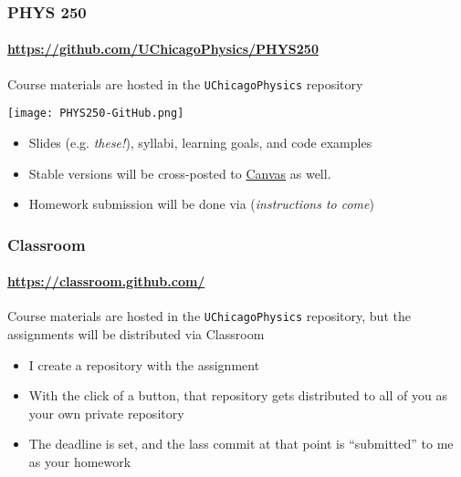 \documentclass[hyperref={colorlinks=true}]{beamer}
\begin{document}
\begin{frame}%
  \frametitle{PHYS 250 \github}
  \framesubtitle{\url{https://github.com/UChicagoPhysics/PHYS250}}
  
  Course materials are hosted in the \github \texttt{UChicagoPhysics} repository
  
  \begin{center}
    \texttt{[image: PHYS250-GitHub.png]}
  \end{center}

  \vspace{-0.5cm}

  \begin{itemize}
    \item Slides (e.g. \textit{these!}), syllabi, learning goals, and code examples
    \item Stable versions will be cross-posted to \href{\CanvasURL}{Canvas} as well.
    \item Homework submission will be done via \github (\textit{instructions to come})
  \end{itemize}
  
  
\end{frame}


\begin{frame}%
  \frametitle{\github Classroom}
  \framesubtitle{\url{https://classroom.github.com/}}
  
  Course materials are hosted in the \github \texttt{UChicagoPhysics} repository, but the assignments will be distributed via \github Classroom
  
  \begin{itemize}
    \item I create a repository with the assignment
    \item With the click of a button, that repository gets distributed to all of you as your own private repository
    \item The deadline is set, and the lass commit at that point is ``submitted'' to me as your homework 
  \end{itemize}
  
  
\end{frame}

\end{document}
